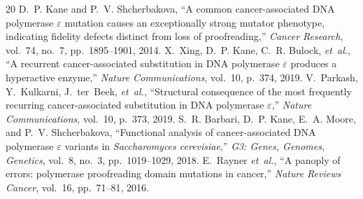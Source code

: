 \documentclass[11pt,a4paper]{article}
\theoremstyle{definition}
\begin{document}
\begin{thebibliography}{20}
D.~P. Kane and P.~V. Shcherbakova, ``A common cancer-associated DNA polymerase $\varepsilon$ mutation causes an exceptionally strong mutator phenotype, indicating fidelity defects distinct from loss of proofreading,'' \emph{Cancer Research}, vol.~74, no.~7, pp.~1895--1901, 2014.
X.~Xing, D.~P. Kane, C.~R. Bulock, \emph{et~al.}, ``A recurrent cancer-associated substitution in DNA polymerase $\varepsilon$ produces a hyperactive enzyme,'' \emph{Nature Communications}, vol.~10, p.~374, 2019.
V.~Parkash, Y.~Kulkarni, J.~ter~Beek, \emph{et~al.}, ``Structural consequence of the most frequently recurring cancer-associated substitution in DNA polymerase $\varepsilon$,'' \emph{Nature Communications}, vol.~10, p.~373, 2019.
S.~R. Barbari, D.~P. Kane, E.~A. Moore, and P.~V. Shcherbakova, ``Functional analysis of cancer-associated DNA polymerase $\varepsilon$ variants in \emph{Saccharomyces cerevisiae},'' \emph{G3: Genes, Genomes, Genetics}, vol.~8, no.~3, pp.~1019--1029, 2018.
E.~Rayner \emph{et~al.}, ``A panoply of errors: polymerase proofreading domain mutations in cancer,'' \emph{Nature Reviews Cancer}, vol.~16, pp.~71--81, 2016.
\end{thebibliography}
\end{document}
